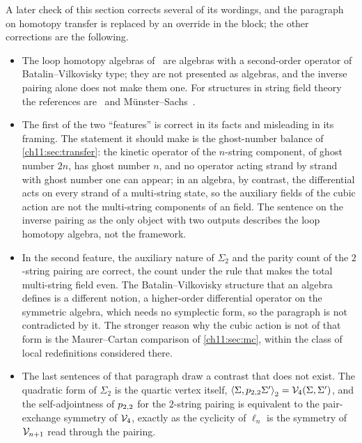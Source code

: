 A later check of this section corrects several of its wordings, and the paragraph on homotopy transfer is replaced by an override in the block; the other corrections are the following.
\begin{itemize}
  \setlength{\itemsep}{0.3ex}

  \item The loop homotopy algebras of~\cite{Markl:2001:LoopHomotopyAlgebras} are \Loo{} algebras with a second-order operator of Batalin--Vilkovisky type; they are not presented as \IBL{} algebras, and the inverse pairing alone does not make them one.
    For \IBL{} structures in string field theory the references are~\cite{Cieliebak:2015:HomologicalAlgebraRelated, Markl:2017:MVFormalismIBL} and Münster--Sachs~\cite{Muenster:2013:QuantumOpenClosedHomotopy}.

  \item The first of the two \enquote{features} is correct in its facts and misleading in its framing.
    The statement it should make is the ghost-number balance of \cref{ch11:sec:transfer}: the kinetic operator of the $n$-string component, of ghost number $2 n$, has ghost number $n$, and no operator acting strand by strand with ghost number one can appear; in an \IBL{} algebra, by contrast, the differential acts on every strand of a multi-string state, so the auxiliary fields of the cubic action are not the multi-string components of an \IBL{} field.
    The sentence on the inverse pairing as the only object with two outputs describes the loop homotopy algebra, not the \IBL{} framework.

  \item In the second feature, the auxiliary nature of $\Sigma_2$ and the parity count of the $2$-string pairing are correct, the count under the rule that makes the total multi-string field even.
    The Batalin--Vilkovisky structure that an \IBL{} algebra defines is a different notion, a higher-order differential operator on the symmetric algebra, which needs no symplectic form, so the paragraph is not contradicted by it.
    The stronger reason why the cubic action is not of that form is the Maurer--Cartan comparison of \cref{ch11:sec:mc}, within the class of local redefinitions considered there.

  \item The last sentences of that paragraph draw a contrast that does not exist.
    The quadratic form of $\Sigma_2$ is the quartic vertex itself, $\pair[2]{\Sigma}{\sprod{2}{2} \Sigma'} = \vertex{4}(\Sigma, \Sigma')$, and the self-adjointness of $\sprod{2}{2}$ for the $2$-string pairing is equivalent to the pair-exchange symmetry of $\vertex{4}$, exactly as the cyclicity of $\ell_n$ is the symmetry of $\vertex{n + 1}$ read through the pairing.


\end{itemize}
